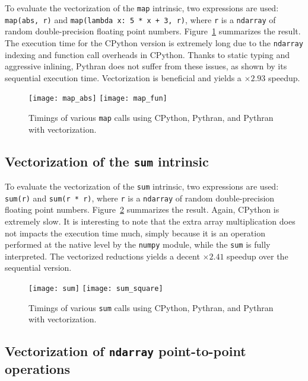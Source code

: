 \documentclass[preprint]{sigplanconf}
\begin{document}
To evaluate the vectorization of the \texttt{map} intrinsic, two expressions
are used: \texttt{map(abs, r)} and \texttt{map(lambda x: 5 * x + 3, r)}, where
\texttt{r} is a \texttt{ndarray} of random double-precision floating point
numbers. Figure~\ref{fig:map-timings} summarizes the result. The execution time
for the CPython version is extremely long due to the \texttt{ndarray} indexing and
function call overheads in CPython. Thanks to static typing and aggressive
inlining, Pythran does not suffer from these issues, as shown by its sequential
execution time. Vectorization is beneficial and yields a $\times2.93$ speedup.

\begin{figure}[ht]

    \texttt{[image: map\_abs]}
    \texttt{[image: map\_fun]}
    \caption{Timings of various \texttt{map} calls using CPython, Pythran, and Pythran with vectorization.}
    \label{fig:map-timings}

\end{figure}

\subsection{Vectorization of the \texttt{sum} intrinsic}

To evaluate the vectorization of the \texttt{sum} intrinsic, two expressions
are used: \texttt{sum(r)} and \texttt{sum(r * r)}, where \texttt{r} is a
\texttt{ndarray} of random double-precision floating point numbers.
Figure~\ref{fig:sum-timings} summarizes the result. Again, CPython is extremely
slow. It is interesting to note that the extra array multiplication does not
impacts the execution time much, simply because it is an operation performed at
the native level by the \texttt{numpy} module, while the \texttt{sum} is fully
interpreted. The vectorized reductions yields a decent $\times2.41$ speedup
over the sequential version.

\begin{figure}[ht]

    \texttt{[image: sum]}
    \texttt{[image: sum\_square]}
    \caption{Timings of various \texttt{sum} calls using CPython, Pythran, and Pythran with vectorization.}
    \label{fig:sum-timings}

\end{figure}

\subsection{Vectorization of \texttt{ndarray} point-to-point operations}
\label{sec:bench-numpy}
\end{document}
